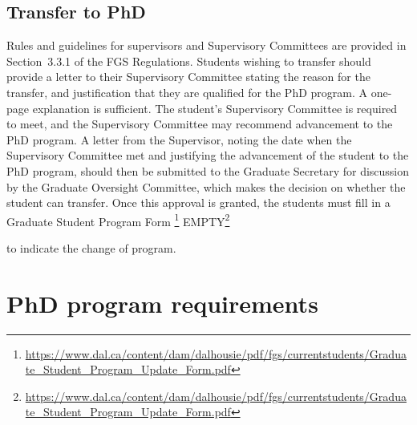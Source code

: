 \documentclass[12pt]{article}
\newcommand{\fixme}[1]{\color{fixmeColor}$\{$#1$\}$\color{black}\index{$>>>>$FIXME$<<<<$}}
\newcommand{\parnum}{\arabic{parcount}}
\newcounter{parcount}
\newcommand\p{\stepcounter{parcount}\leavevmode{\raisebox{0.2ex}{\scriptsize[\parnum]}}\hspace{0.2em}}
\newcommand\cp{\setcounter{parcount}{0}}
\newcommand{\furl}[2][EMPTY]%
    {\ifthenelse%
        {\equal{#1}{EMPTY}}%
        {\footnote{\footnotesize{\url{#2}}}}%
        {#1\footnote{\footnotesize{\url{#2}}}}%
    }
\newcommand{\supervisor}{Supervisor\xspace}
\newcommand{\supcom}{Supervisory Committee\xspace}
\newcommand{\gocom}{Graduate Oversight Committee\xspace}
\newcommand{\GS}{Graduate Secretary\xspace}
\newcommand{\fgsregs}{FGS Regulations\xspace}
\begin{document}
\subsection{\label{sec:transfer_to_phd}Transfer to PhD}

\cp

Rules and guidelines for supervisors and {\supcom}s are provided in
Section~3.3.1 of the \fgsregs.  Students wishing to transfer should provide a
letter to their \supcom stating the reason for the transfer, and justification
that they are qualified for the PhD program. A one-page explanation is
sufficient. The student's \supcom is required to meet, and the \supcom may
recommend advancement to the PhD program.  A letter from the \supervisor,
noting the date when the \supcom met and justifying the advancement of the
student to the PhD program, should then be submitted to the \GS for discussion
by the \gocom, which makes the decision on whether the student can transfer.
Once this approval is granted, the students must fill in a
Graduate Student Program Form\furl{https://www.dal.ca/content/dam/dalhousie/pdf/fgs/currentstudents/Graduate_Student_Program_Update_Form.pdf}
to indicate the change of program.





\section{\label{sec:phd_program_requirements}PhD program requirements}
\end{document}
